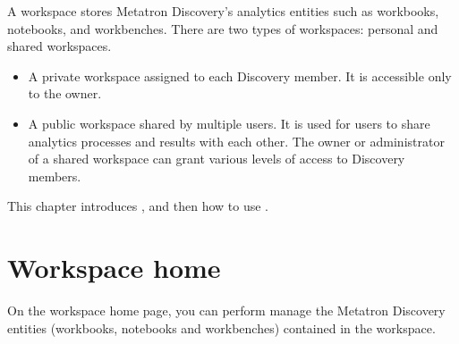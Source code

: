 \documentclass[letterpaper,10pt,english]{sphinxmanual}
\begin{document}
A workspace stores Metatron Discovery’s analytics entities such as workbooks, notebooks, and workbenches. There are two types of workspaces: personal and shared workspaces.
\begin{itemize}
\item {} 
 A private workspace assigned to each Discovery member. It is accessible only to the owner.

\item {} 
 A public workspace shared by multiple users. It is used for users to share analytics processes and results with each other. The owner or administrator of a shared workspace can grant various levels of access to Discovery members.

\end{itemize}

This chapter introduces , and then how to use .


\section{Workspace home}
\label{\detokenize{discovery/part03/workspace_management:id1}}\label{\detokenize{discovery/part03/workspace_management::doc}}
On the workspace home page, you can perform manage the Metatron Discovery entities (workbooks, notebooks and workbenches) contained in the workspace.
\end{document}
